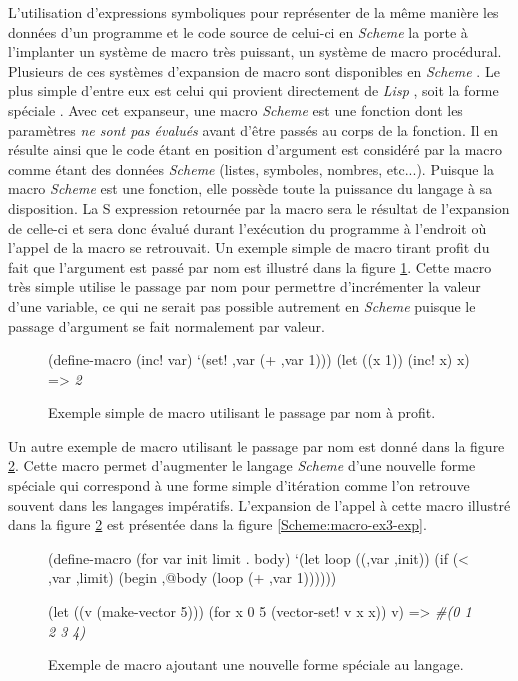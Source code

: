 \documentclass[12pt,twoside,letterpaper,francais]{book}
\newcommand{\lisp}{{\textit{Lisp }}}
\newcommand{\Schemelang}{{\textit{Scheme }}}
\newcommand{\scheme}[1]{\selectlanguage{english}{\tt #1}\selectlanguage{french}}
\newcommand{\schemeresult}[1]{{\it #1}}
\begin{document}
L'utilisation d'expressions symboliques pour représenter de la même
manière les données d'un programme et le code source de celui-ci en
\Schemelang la porte à l'implanter un système de macro très puissant, un
système de macro procédural. Plusieurs de ces systèmes d'expansion de
macro sont disponibles en \Schemelang. Le plus simple d'entre eux est celui
qui provient directement de \lisp, soit la forme spéciale
\scheme{define-macro}. Avec cet expanseur, une macro \Schemelang est une
fonction dont les paramètres \emph{ne sont pas évalués} avant d'être
passés au corps de la fonction. Il en résulte ainsi que le code étant
en position d'argument est considéré par la macro comme étant des
données \Schemelang (listes, symboles, nombres, etc...). Puisque la macro
\Schemelang est une fonction, elle possède toute la puissance du langage à
sa disposition. La S expression retournée par la macro sera le
résultat de l'expansion de celle-ci et sera donc évalué durant
l'exécution du programme à l'endroit où l'appel de la macro se
retrouvait. Un exemple simple de macro tirant profit du fait que
l'argument est passé par nom est illustré dans la figure
\ref{Scheme:macro-ex2}. Cette macro très simple utilise le passage par
nom pour permettre d'incrémenter la valeur d'une variable, ce qui ne
serait pas possible autrement en \Schemelang puisque le passage d'argument
se fait normalement par valeur.

\begin{figure}[htb!]
  \begin{schemecode}
(define-macro (inc! var) `(set! ,var (+ ,var 1)))
(let ((x 1))
    (inc! x)
    x) => \schemeresult{2}
  \end{schemecode}
  \caption{Exemple simple de macro utilisant le passage par nom à profit.}
  \label{Scheme:macro-ex2}
\end{figure}


Un autre exemple de macro utilisant le passage par nom est donné dans
la figure \ref{Scheme:macro-ex3}. Cette macro permet d'augmenter le
langage \Schemelang d'une nouvelle forme spéciale qui correspond à une
forme simple d'itération comme l'on retrouve souvent dans les langages
impératifs. L'expansion de l'appel à cette macro illustré dans la
figure \ref{Scheme:macro-ex3} est présentée dans la figure
\ref{Scheme:macro-ex3-exp}.

\begin{figure}[htb!]
  \begin{schemecode}
(define-macro (for var init limit . body)
  `(let loop ((,var ,init))
     (if (< ,var ,limit)
         (begin ,@body
                (loop (+ ,var 1))))))

(let ((v (make-vector 5)))
  (for x 0 5 (vector-set! v x x))
  v) => \schemeresult{\#(0 1 2 3 4)}
  \end{schemecode}
  \caption{Exemple de macro ajoutant une nouvelle forme spéciale au langage.}
  \label{Scheme:macro-ex3}
\end{figure}
\end{document}
